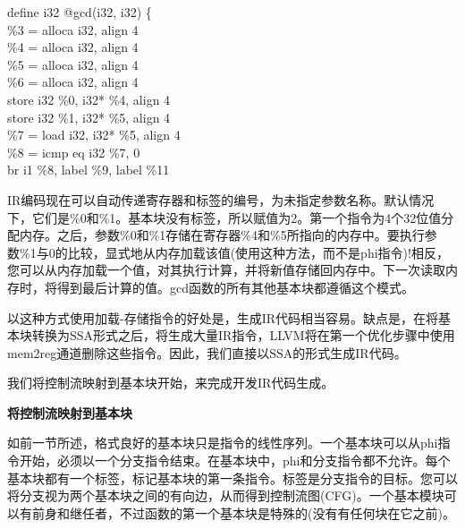 \begin{tcolorbox}[colback=white,colframe=black]
define i32 @gcd(i32, i32) \{ \\
\hspace*{0.5cm}\%3 = alloca i32, align 4 \\
\hspace*{0.5cm}\%4 = alloca i32, align 4 \\
\hspace*{0.5cm}\%5 = alloca i32, align 4 \\
\hspace*{0.5cm}\%6 = alloca i32, align 4 \\
\hspace*{0.5cm}store i32 \%0, i32* \%4, align 4 \\
\hspace*{0.5cm}store i32 \%1, i32* \%5, align 4 \\
\hspace*{0.5cm}\%7 = load i32, i32* \%5, align 4 \\
\hspace*{0.5cm}\%8 = icmp eq i32 \%7, 0 \\
\hspace*{0.5cm}br i1 \%8, label \%9, label \%11
\end{tcolorbox}

IR编码现在可以自动传递寄存器和标签的编号，为未指定参数名称。默认情况下，它们是\%0和\%1。基本块没有标签，所以赋值为2。第一个指令为4个32位值分配内存。之后，参数\%0和\%1存储在寄存器\%4和\%5所指向的内存中。要执行参数\%1与0的比较，显式地从内存加载该值(使用这种方法，而不是phi指令)!相反，您可以从内存加载一个值，对其执行计算，并将新值存储回内存中。下一次读取内存时，将得到最后计算的值。gcd函数的所有其他基本块都遵循这个模式。\par

以这种方式使用加载-存储指令的好处是，生成IR代码相当容易。缺点是，在将基本块转换为SSA形式之后，将生成大量IR指令，LLVM将在第一个优化步骤中使用mem2reg通道删除这些指令。因此，我们直接以SSA的形式生成IR代码。\par

我们将控制流映射到基本块开始，来完成开发IR代码生成。\par

\hspace*{\fill} \par %
\textbf{将控制流映射到基本块}

如前一节所述，格式良好的基本块只是指令的线性序列。一个基本块可以从phi指令开始，必须以一个分支指令结束。在基本块中，phi和分支指令都不允许。每个基本块都有一个标签，标记基本块的第一条指令。标签是分支指令的目标。您可以将分支视为两个基本块之间的有向边，从而得到控制流图(CFG)。一个基本模块可以有前身和继任者，不过函数的第一个基本块是特殊的(没有有任何块在它之前)。\par

